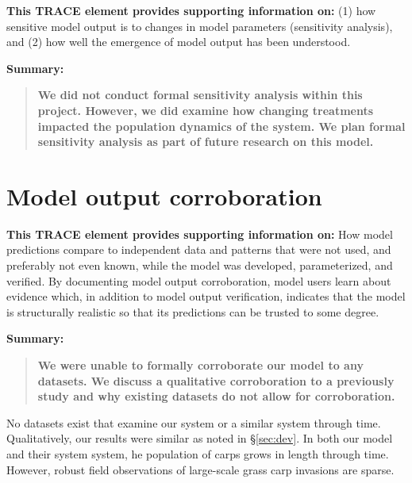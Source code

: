 \documentclass{article}[12pt]
\begin{document}
\textbf{This TRACE element provides supporting information on:} (1) how sensitive model output is to changes in model parameters (sensitivity analysis), and (2) how well the emergence of model output has been understood. 

\textbf{Summary:}
\begin{verse}
\textbf{
We did not conduct formal sensitivity analysis within this project.
However, we did examine how changing treatments impacted the population dynamics of the system.
We plan formal sensitivity analysis as part of future research on this model.
}
\end{verse}

\section{Model output corroboration}

\textbf{This TRACE element provides supporting information on:}  How model predictions compare to independent data and patterns that were not used, and preferably not even known, while the model was developed, parameterized, and verified. By documenting model output corroboration, model users learn about evidence which, in addition to model output verification, indicates that the model is structurally realistic so that its predictions can be trusted to some degree. 

\textbf{Summary:}
\begin{verse}
\textbf{
We were unable to formally corroborate our model to any datasets.
We discuss a qualitative corroboration to a previously study and why existing datasets do not allow for corroboration.
}
\end{verse}

No datasets exist that examine our system or a similar system through time.
Qualitatively, our results were similar \citet{martyn1986mapping} as noted in \S \ref{sec:dev}.
In both our model and their system system, he population of carps grows in length through time. 
However, robust field observations of large-scale grass carp invasions are sparse. 




\end{document}
